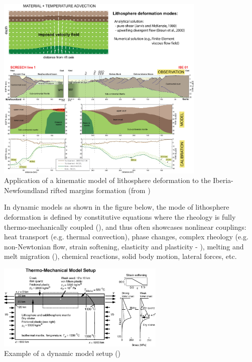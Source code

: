 \begin{center}
\includegraphics[width=10cm]{python_codes/fieldstone_178/images/Lfig3.jpg}\\
{\captionfont Application of a kinematic model of lithosphere deformation to the Iberia-Newfoundland rifted margins formation (from \cite{jekm16})}
\label{KinemModel}
\end{center}

In dynamic models as shown in the figure below, the mode of lithosphere deformation is defined by 
constitutive equations where the rheology is fully thermo-mechanically coupled (\cite{thie11}), and thus often showcases
nonlinear couplings: heat transport (e.g. thermal convection), phase changes, complex rheology (e.g. non-Newtonian 
flow, strain softening, elasticity and plasticity - \cite{hube03,hubb05,hube07}), melting and melt 
migration (\cite{arhm09, latb17}), chemical reactions, solid body motion, lateral forces, etc. 

\begin{center}
\includegraphics[width=8cm]{python_codes/fieldstone_178/images/Lfig4.jpg}\\
{\captionfont Example of a dynamic model setup (\cite{hube03})}
\label{DynamModel}
\end{center}


